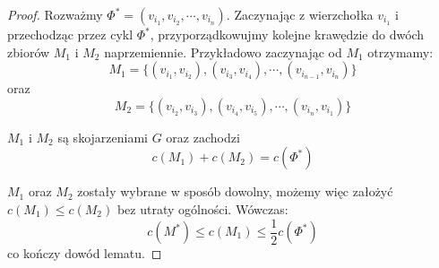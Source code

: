 \documentclass{article}
\theoremstyle{definition}
\theoremstyle{plain}
\theoremstyle{remark}
\begin{document}
\begin{proof}
Rozważmy $\Phi^* = (v_{i_1}, v_{i_2}, \cdots, v_{i_n})$. Zaczynając z wierzchołka $v_{i_1}$ i przechodząc przez cykl $\Phi^*$, przyporządkowujmy kolejne krawędzie do dwóch zbiorów $M_1$ i $M_2$ naprzemiennie. 
Przykładowo zaczynając od $M_1$ otrzymamy:
\[
  M_1 = \{(v_{i_1}, v_{i_2}), (v_{i_3}, v_{i_4}), \cdots, (v_{i_{n - 1}}, v_{i_n})\}
\] 
oraz 
\[
  M_2 = \{(v_{i_2}, v_{i_3}), (v_{i_4}, v_{i_5}), \cdots, (v_{i_{n}}, v_{i_1})\}
\] 

\noindent
$M_1$ i $M_2$ są skojarzeniami $G$ oraz zachodzi 
\[
  c(M_1) + c(M_2) = c(\Phi^*)
\]

\noindent
$M_1$ oraz $M_2$ zostały wybrane w sposób dowolny, możemy więc założyć $c(M_1) \leq c(M_2)$ bez utraty ogólności. Wówczas:
\[
  c(M^*) \leq c(M_1) \leq \frac{1}{2}c(\Phi^*)
\]
co kończy dowód lematu. \end{proof}
\end{document}
